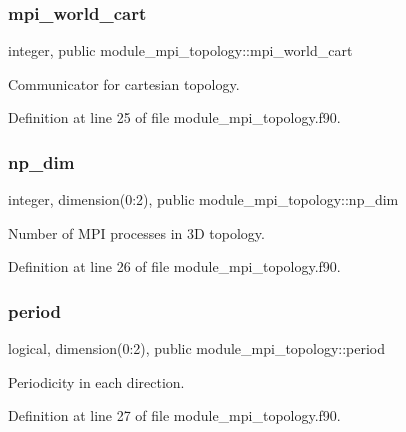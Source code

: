 \subsubsection{\texorpdfstring{mpi\_world\_cart}{mpi\_world\_cart}}
{\footnotesize\ttfamily integer, public module\+\_\+mpi\+\_\+topology\+::mpi\+\_\+world\+\_\+cart}



Communicator for cartesian topology. 



Definition at line 25 of file module\+\_\+mpi\+\_\+topology.\+f90.

\mbox{\label{namespacemodule__mpi__topology_a129f2497619c696b219ad7ea3531d419}} 
\subsubsection{\texorpdfstring{np\_dim}{np\_dim}}
{\footnotesize\ttfamily integer, dimension(0\+:2), public module\+\_\+mpi\+\_\+topology\+::np\+\_\+dim}



Number of M\+PI processes in 3D topology. 



Definition at line 26 of file module\+\_\+mpi\+\_\+topology.\+f90.

\mbox{\label{namespacemodule__mpi__topology_a8fd6ae9fc5b86ed659bb09d19f66b472}} 
\subsubsection{\texorpdfstring{period}{period}}
{\footnotesize\ttfamily logical, dimension(0\+:2), public module\+\_\+mpi\+\_\+topology\+::period}



Periodicity in each direction. 



Definition at line 27 of file module\+\_\+mpi\+\_\+topology.\+f90.

